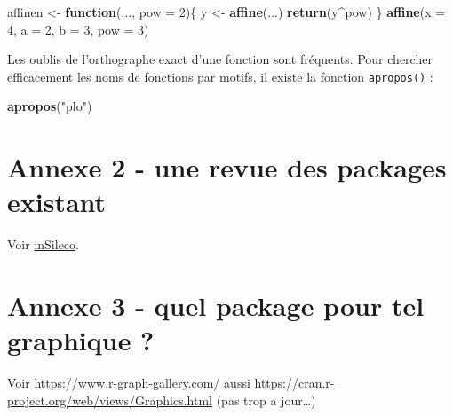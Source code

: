 \documentclass[]{article}
\newenvironment{Shaded}{\begin{snugshade}}{\end{snugshade}}
\newcommand{\ControlFlowTok}[1]{\textcolor[rgb]{0.13,0.29,0.53}{\textbf{#1}}}
\newcommand{\DataTypeTok}[1]{\textcolor[rgb]{0.13,0.29,0.53}{#1}}
\newcommand{\DecValTok}[1]{\textcolor[rgb]{0.00,0.00,0.81}{#1}}
\newcommand{\KeywordTok}[1]{\textcolor[rgb]{0.13,0.29,0.53}{\textbf{#1}}}
\newcommand{\NormalTok}[1]{#1}
\newcommand{\OperatorTok}[1]{\textcolor[rgb]{0.81,0.36,0.00}{\textbf{#1}}}
\newcommand{\StringTok}[1]{\textcolor[rgb]{0.31,0.60,0.02}{#1}}
\begin{document}
\begin{Shaded}
\begin{Highlighting}[]
\NormalTok{affinen <-}\StringTok{ }\ControlFlowTok{function}\NormalTok{(..., }\DataTypeTok{pow =} \DecValTok{2}\NormalTok{)\{}
\NormalTok{  y <-}\StringTok{ }\KeywordTok{affine}\NormalTok{(...)}
  \KeywordTok{return}\NormalTok{(y}\OperatorTok{^}\NormalTok{pow)}
\NormalTok{\}}
\KeywordTok{affine}\NormalTok{(}\DataTypeTok{x =} \DecValTok{4}\NormalTok{, }\DataTypeTok{a =} \DecValTok{2}\NormalTok{, }\DataTypeTok{b =} \DecValTok{3}\NormalTok{, }\DataTypeTok{pow =} \DecValTok{3}\NormalTok{)}
\end{Highlighting}
\end{Shaded}

Les oublis de l'orthographe exact d'une fonction sont fréquents. Pour chercher
efficacement les noms de fonctions par motifs, il existe la fonction \texttt{apropos()}
:

\begin{Shaded}
\begin{Highlighting}[]
\KeywordTok{apropos}\NormalTok{(}\StringTok{"plo"}\NormalTok{)}
\end{Highlighting}
\end{Shaded}

\hypertarget{annexe-2---une-revue-des-packages-existant}{%
\section*{Annexe 2 - une revue des packages existant}\label{annexe-2---une-revue-des-packages-existant}}

Voir \href{https://insileco.github.io/wiki/rgraphpkgs/}{inSileco}.

\hypertarget{annexe-3---quel-package-pour-tel-graphique}{%
\section{Annexe 3 - quel package pour tel graphique ?}\label{annexe-3---quel-package-pour-tel-graphique}}

Voir \url{https://www.r-graph-gallery.com/}
aussi \url{https://cran.r-project.org/web/views/Graphics.html} (pas trop a jour\ldots{})


\end{document}

